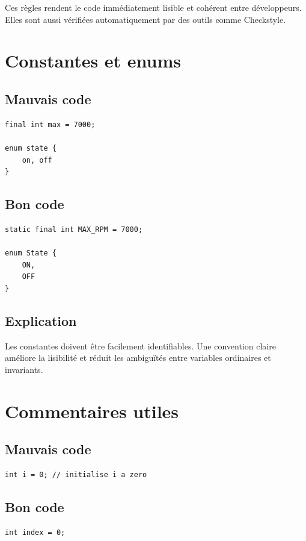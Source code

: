 \documentclass[a4paper,11pt]{report}
\begin{document}
Ces règles rendent le code immédiatement lisible et cohérent entre développeurs.
Elles sont aussi vérifiées automatiquement par des outils comme Checkstyle.

\chapter{Constantes et enums}

\section{Mauvais code}
\begin{lstlisting}
final int max = 7000;

enum state {
    on, off
}
\end{lstlisting}

\section{Bon code}
\begin{lstlisting}
static final int MAX_RPM = 7000;

enum State {
    ON,
    OFF
}
\end{lstlisting}

\section{Explication}
Les constantes doivent être facilement identifiables.
Une convention claire améliore la lisibilité et réduit les ambiguïtés entre variables ordinaires et invariants.

\chapter{Commentaires utiles}

\section{Mauvais code}
\begin{lstlisting}
int i = 0; // initialise i a zero
\end{lstlisting}

\section{Bon code}
\begin{lstlisting}
int index = 0;
\end{lstlisting}
\end{document}
